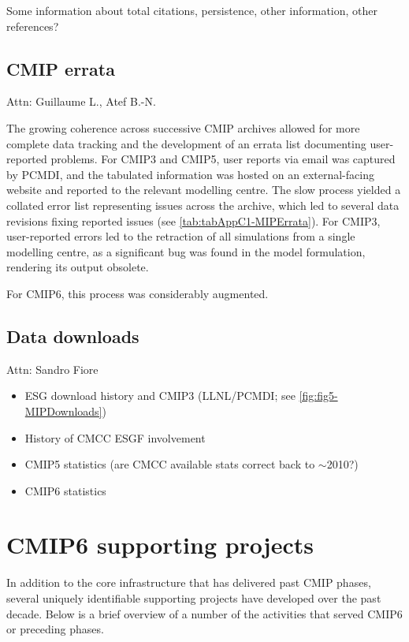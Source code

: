 \documentclass[gmd, preprint]{copernicus}
\newcommand{\mycomment}[1]{}
\def\cred#1{{\color{red}#1}}
\begin{document}
\cred{Some information about total citations, persistence, other information, other references?}
\mycomment{
https://www.ipcc-data.org/sim/gcm_monthly/AR5/WG1-Archive.html
https://www.wdc-climate.de/ui/statistics?type=cmip6_doi_registration
https://commons.datacite.org/repositories/8orcv25 - Master overview 6012 citations
https://www.wdc-climate.de/ords/f?p=127:2 - CMIP6 data references
https://www.wdc-climate.de/ui/cmip6?input=CMIP6.ScenarioMIP.NOAA-GFDL.GFDL-CM4.ssp585
https://www.wdc-climate.de/ui/cmip6?input=input4MIPs.CMIP6.CMIP.PCMDI
}


\subsection{CMIP errata}
\label{sec:CMIPErrata}
\cred{Attn: Guillaume L., Atef B.-N.}

The growing coherence across successive CMIP archives allowed for more complete data tracking and the development of an errata list documenting user-reported problems. For CMIP3 and CMIP5, user reports via email was captured by PCMDI, and the tabulated information was hosted on an external-facing website and reported to the relevant modelling centre. The slow process yielded a collated error list representing issues across the archive, which led to several data revisions fixing reported issues (see \autoref{tab:tabAppC1-MIPErrata}). For CMIP3, user-reported errors led to the retraction of all simulations from a single modelling centre, as a significant bug was found in the model formulation, rendering its output obsolete.

\cred{For CMIP6, this process was considerably augmented.}


\subsection{Data downloads}
\label{sec:CMIPDataDownloads}
\cred{Attn: Sandro Fiore}
\cred{
\begin{itemize}
	\item ESG download history and CMIP3 (LLNL/PCMDI; see \autoref{fig:fig5-MIPDownloads})
    \item History of CMCC ESGF involvement
	\item CMIP5 statistics (are CMCC available stats correct back to $\sim$2010?)
	\item CMIP6 statistics
\end{itemize}
}


\section{CMIP6 supporting projects}
\label{sec:CMIP6SupportingProjects}
In addition to the core infrastructure that has delivered past CMIP phases, several uniquely identifiable supporting projects have developed over the past decade. Below is a brief overview of a number of the activities that served CMIP6 or preceding phases.
\end{document}
